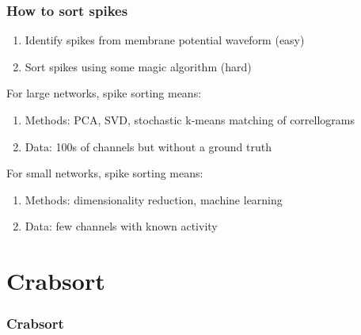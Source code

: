 \documentclass{beamer}
\begin{document}
\begin{frame}
  \frametitle{How to sort spikes}

  \begin{enumerate}
    \item Identify spikes from membrane potential waveform (easy)
    \item Sort spikes using some magic algorithm (hard)
  \end{enumerate}

  \medskip

  For large networks, spike sorting means:

  \begin{enumerate}
    \item Methods: PCA, SVD, stochastic k-means matching of correllograms
    \item Data: 100s of channels but without a ground truth
  \end{enumerate}

  \medskip

  For small networks, spike sorting means:

  \begin{enumerate}
    \item Methods: dimensionality reduction, machine learning
    \item Data: few channels with known activity
  \end{enumerate}

\end{frame}


\section{Crabsort}

\begin{frame}
  \frametitle{Crabsort}
\end{frame}

\end{document}
